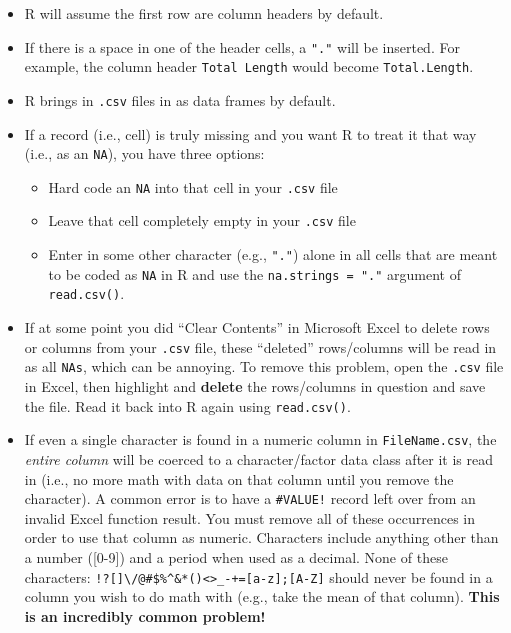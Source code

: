 \documentclass[]{book}
\providecommand{\tightlist}{%
  \setlength{\itemsep}{0pt}\setlength{\parskip}{0pt}}
\begin{document}
\begin{itemize}
\tightlist
\item
  R will assume the first row are column headers by default.
\item
  If there is a space in one of the header cells, a \texttt{"."} will be inserted. For example, the column header \texttt{Total\ Length} would become \texttt{Total.Length}.
\item
  R brings in \texttt{.csv} files in as data frames by default.
\item
  If a record (i.e., cell) is truly missing and you want R to treat it that way (i.e., as an \texttt{NA}), you have three options:

  \begin{itemize}
  \tightlist
  \item
    Hard code an \texttt{NA} into that cell in your \texttt{.csv} file
  \item
    Leave that cell completely empty in your \texttt{.csv} file
  \item
    Enter in some other character (e.g., \texttt{"."}) alone in all cells that are meant to be coded as \texttt{NA} in R and use the \texttt{na.strings\ =\ "."} argument of \texttt{read.csv()}.
  \end{itemize}
\item
  If at some point you did ``Clear Contents'' in Microsoft Excel to delete rows or columns from your \texttt{.csv} file, these ``deleted'' rows/columns will be read in as all \texttt{NAs}, which can be annoying. To remove this problem, open the \texttt{.csv} file in Excel, then highlight and \textbf{delete} the rows/columns in question and save the file. Read it back into R again using \texttt{read.csv()}.
\item
  If even a single character is found in a numeric column in \texttt{FileName.csv}, the \emph{entire column} will be coerced to a character/factor data class after it is read in (i.e., no more math with data on that column until you remove the character). A common error is to have a \texttt{\#VALUE!} record left over from an invalid Excel function result. You must remove all of these occurrences in order to use that column as numeric. Characters include anything other than a number ({[}0-9{]}) and a period when used as a decimal. None of these characters: \texttt{!?{[}{]}\textbackslash{}/@\#\$\%\^{}\&*()\textless{}\textgreater{}\_-+={[}a-z{]};{[}A-Z{]}} should never be found in a column you wish to do math with (e.g., take the mean of that column). \textbf{This is an incredibly common problem!}
\end{itemize}
\end{document}
